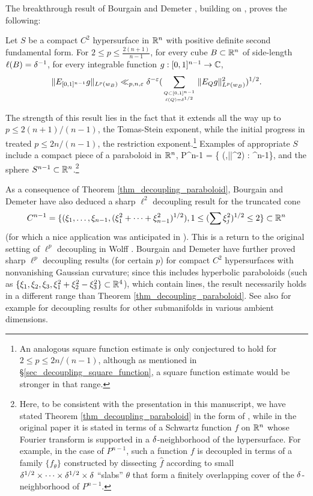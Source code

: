 \documentclass[brochure,english,12pt]{bourbaki}%
\newcommand{\C}{\mathbb{C}}
\begin{document}
The breakthrough result of Bourgain and Demeter \cite{BouDem15}, building on \cite{Bou13}, proves the following:
\begin{theo}\label{thm_decoupling_paraboloid}
Let $S$ be a compact $C^2$ hypersurface in $\mathbb{R}^n$ with positive definite second fundamental form.  For $2 \leq p \leq \frac{2(n+1)}{n-1}$, for every cube $B \subset \mathbb{R}^n$ of side-length $\ell(B)=\delta^{-1}$, for every integrable function $g :[0,1]^{n-1} \maps \C$,
\[ \|E_{[0,1]^{n-1}} g\|_{L^p(w_{B})} \ll_{p,n,\varepsilon} \delta^{-\varepsilon} ( \sum_{Q \subset [0,1]^{n-1} \atop \ell(Q) = \delta^{1/2}} \|E_Q g\|_{L^p(w_{B})}^2)^{1/2}.
\]
\end{theo}
The strength of this result lies in the fact that it extends all the way up to $p \leq 2(n+1)/(n-1)$, the Tomas-Stein exponent, while the initial progress in \cite{Bou13} treated $p \leq 2n/(n-1)$, the restriction exponent.\footnote{An analogous square function estimate is only conjectured to hold for $2 \leq p \leq 2n/(n-1)$, although as mentioned in \S \ref{sec_decoupling_square_function}, a square function estimate would be stronger in that range.}
Examples of  appropriate $S$ include  a compact piece of a paraboloid in $\mathbb{R}^n$, 
\beq\label{S_truncated_paraboloid}
 P^{n-1} = \{ (\xi,|\xi|^2) : \xi \in [0,1]^{n-1}\},
 \eeq
and  the sphere $S^{n-1} \subset \mathbb{R}^n$.\footnote{Here, to be consistent with the presentation in this manuscript, we have stated Theorem \ref{thm_decoupling_paraboloid} in the form of \cite[Thm. 1.1]{BouDem17a}, while in the original paper \cite[Thm. 1.1]{BouDem15} it is stated in terms of a Schwartz function $f$ on $\mathbb{R}^n$ whose Fourier transform is supported in a $\delta$-neighborhood of the hypersurface. For example, in the case of $P^{n-1}$, such a function $f$ is  decoupled in terms of  a family $\{f_\theta\}$ constructed by dissecting $\hat{f}$ according to small $\delta^{1/2} \times  \cdots \times \delta^{1/2} \times \delta$ ``slabs'' $\theta$ that form a finitely overlapping cover of the $\delta$-neighborhood of $P^{n-1}$.}



As a consequence of Theorem \ref{thm_decoupling_paraboloid}, Bourgain and Demeter \cite[Thm. 1.2]{BouDem15} have also deduced  a sharp $\ell^2$ decoupling result for the truncated cone
\[ C^{n-1} = \{ (\xi_1,\ldots, \xi_{n-1}, (\xi_1^2 + \cdots + \xi_{n-1}^2)^{1/2}), 1 \leq (\sum \xi_j^2)^{1/2}\leq 2 \} \subset \mathbb{R}^n \]
(for which a nice application was anticipated in \cite{PraSee07}).
This is a return to the original setting of $\ell^p$ decoupling in Wolff \cite{Wol00}.
Bourgain and Demeter \cite{BouDem14x} have further proved sharp $\ell^p$ decoupling results (for certain $p$) for compact $C^2$ hypersurfaces with nonvanishing Gaussian curvature; since this includes hyperbolic paraboloids  (such as $\{\xi_1,\xi_2,\xi_3, \xi_1^2 + \xi_2^2 - \xi_3^2\} \subset \mathbb{R}^4$), which contain lines, the result  necessarily holds in a different range than Theorem \ref{thm_decoupling_paraboloid}. See also for example \cite{BouDem15x, DGS16x, Guo17x, BDG16x, BouDem16a, BouDem16b} for decoupling results for other submanifolds in various ambient dimensions.
\end{document}
